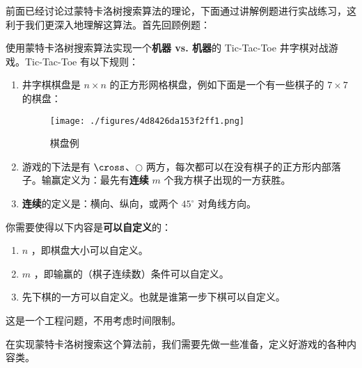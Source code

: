 

前面已经讨论过蒙特卡洛树搜索算法的理论，下面通过讲解例题进行实战练习，这利于我们更深入地理解这算法。首先回顾例题：
\begin{example}{}
使用蒙特卡洛树搜索算法实现一个\textbf{机器 vs. 机器}的 Tic-Tac-Toe 井字棋对战游戏。Tic-Tac-Toe 有以下规则：
\begin{enumerate}
\item 井字棋棋盘是 $n \times n$ 的正方形网格棋盘，例如下面是一个有一些棋子的 $7 \times 7$ 的棋盘：
\begin{figure}[ht]
\centering
\texttt{[image: ./figures/4d8426da153f2ff1.png]}
\caption{棋盘例} \label{fig_MCTSci_2}
\end{figure}
\item 游戏的下法是有 $\cross$、$\bigcirc$ 两方，每次都可以在没有棋子的正方形内部落子。输赢定义为：最先有\textbf{连续} $m$ 个我方棋子出现的一方获胜。
\item \textbf{连续}的定义是：横向、纵向，或两个 $45^\circ$ 对角线方向。
\end{enumerate}

你需要使得以下内容是\textbf{可以自定义}的：
\begin{enumerate}
\item $n$ ，即棋盘大小可以自定义。
\item $m$ ，即输赢的（棋子连续数）条件可以自定义。
\item 先下棋的一方可以自定义。也就是谁第一步下棋可以自定义。
\end{enumerate}

这是一个工程问题，不用考虑时间限制。
\end{example}
在实现蒙特卡洛树搜索这个算法前，我们需要先做一些准备，定义好游戏的各种内容类。
